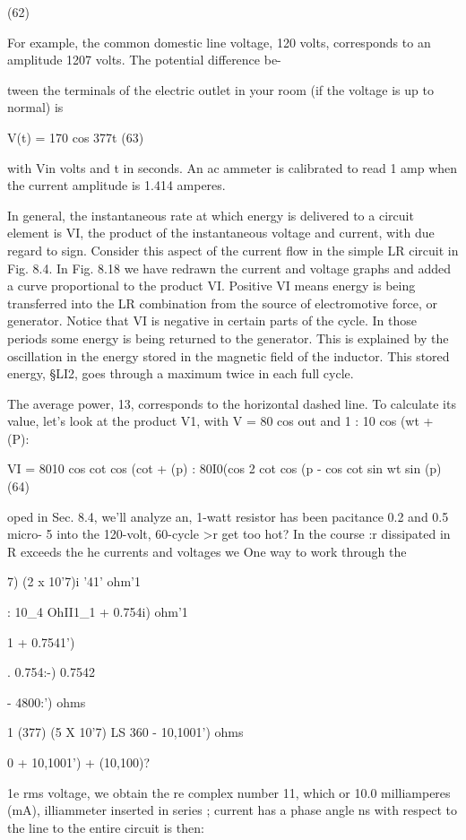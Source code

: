 {(62)

For example, the common domestic line voltage, 120 volts, corresponds
to an amplitude 120\/7 volts. The potential difference be-

tween the terminals of the electric outlet in your room (if the voltage
is up to normal) is

V(t) = 170 cos 377t (63)

with Vin volts and t in seconds. An ac ammeter is calibrated to read
1 amp when the current amplitude is 1.414 amperes.

In general, the instantaneous rate at which energy is delivered to
a circuit element is VI, the product of the instantaneous voltage and
current, with due regard to sign. Consider this aspect of the current
flow in the simple LR circuit in Fig. 8.4. In Fig. 8.18 we have redrawn
the current and voltage graphs and added a curve proportional to
the product VI. Positive VI means energy is being transferred into
the LR combination from the source of electromotive force, or
generator. Notice that VI is negative in certain parts of the cycle.
In those periods some energy is being returned to the generator.
This is explained by the oscillation in the energy stored in the magnetic
field of the inductor. This stored energy, §LI2, goes through
a maximum twice in each full cycle.

The average power, 13, corresponds to the horizontal dashed line.
To calculate its value, let's look at the product V1, with V = 80 cos out
and 1 : 10 cos (wt + (P):

VI = 8010 cos cot cos (cot + (p)
: 80I0(cos 2 cot cos (p - cos cot sin wt sin (p) (64)

oped in Sec. 8.4, we'll analyze
an, 1-watt resistor has been
pacitance 0.2 and 0.5 micro-
5 into the 120-volt, 60-cycle
>r get too hot? In the course
:r dissipated in R exceeds the
he currents and voltages we
One way to work through the

7) (2 x 10'7)i
'41' ohm'1

: 10_4 OhII1_1
+ 0.754i) ohm'1

1
+ 0.7541')

. 0.754:-)
0.7542

- 4800:') ohms

1
(377) (5 X 10'7)
LS
360 - 10,1001') ohms

0 + 10,1001')
+ (10,100)?

1e rms voltage, we obtain the
re complex number 11, which
or 10.0 milliamperes (mA),
illiammeter inserted in series
; current has a phase angle
ns with respect to the line
to the entire circuit is then:

}
